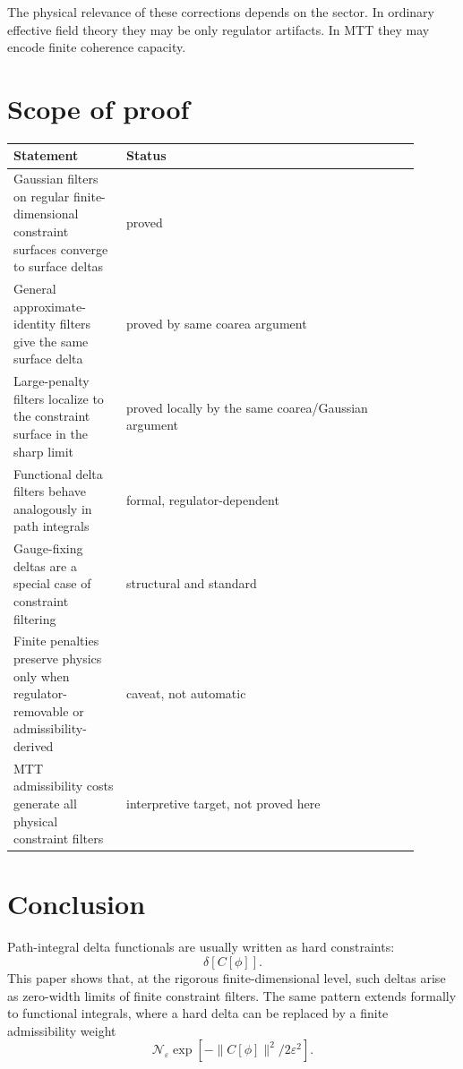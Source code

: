 \documentclass[11pt]{article}
\begin{document}
The physical relevance of these corrections depends on the sector.  In ordinary effective
field theory they may be only regulator artifacts.  In MTT they may encode finite coherence
capacity.

\section{Scope of proof}

\begin{center}
\begin{tabular}{>{\raggedright\arraybackslash}p{0.25\linewidth}>{\raggedright\arraybackslash}p{0.65\linewidth}}
\toprule
Statement & Status \\
\midrule
Gaussian filters on regular finite-dimensional constraint surfaces converge to surface deltas & proved \\
General approximate-identity filters give the same surface delta & proved by same coarea argument \\
Large-penalty filters localize to the constraint surface in the sharp limit & proved locally by the same coarea/Gaussian argument \\
Functional delta filters behave analogously in path integrals & formal, regulator-dependent \\
Gauge-fixing deltas are a special case of constraint filtering & structural and standard \\
Finite penalties preserve physics only when regulator-removable or admissibility-derived & caveat, not automatic \\
MTT admissibility costs generate all physical constraint filters & interpretive target, not proved here \\
\bottomrule
\end{tabular}
\end{center}

\section{Conclusion}

Path-integral delta functionals are usually written as hard constraints:
\[
\delta[C[\phi]].
\]
This paper shows that, at the rigorous finite-dimensional level, such deltas arise as
zero-width limits of finite constraint filters.  The same pattern extends formally to functional
integrals, where a hard delta can be replaced by a finite admissibility weight
\[
\mathcal N_\varepsilon\exp[-\|C[\phi]\|^2/2\varepsilon^2].
\]
\end{document}
